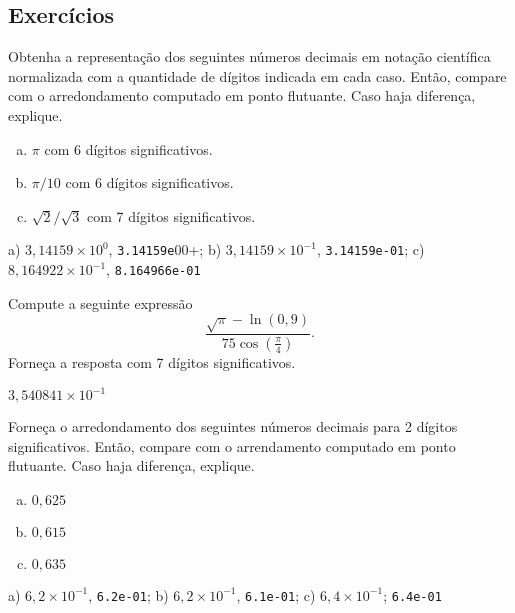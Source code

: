 \subsection{Exercícios}

\begin{exer}
  Obtenha a representação dos seguintes números decimais em notação científica normalizada com a quantidade de dígitos indicada em cada caso. Então, compare com o arredondamento computado em ponto flutuante. Caso haja diferença, explique.
  \begin{enumerate}[a)]
  \item $\pi$ com 6 dígitos significativos.
  \item $\pi/10$ com 6 dígitos significativos.
  \item $\sqrt{2}/\sqrt{3}$ com 7 dígitos significativos.
  \end{enumerate}
\end{exer}
\begin{resp}
  a) $3,14159\times 10^0$, \lstinline+3.14159e+00+; b) $3,14159\times 10^{-1}$, \lstinline+3.14159e-01+; c) $8,164922\times 10^{-1}$, \lstinline+8.164966e-01+
\end{resp}

\begin{exer}
  Compute a seguinte expressão
  \begin{equation}
    \frac{\sqrt{\pi} - \ln(0,9)}{75\cos\left(\frac{\pi}{4}\right)}.
  \end{equation}
  Forneça a resposta com 7 dígitos significativos.
\end{exer}
\begin{resp}
  $3,540841\times 10^{-1}$
\end{resp}

\begin{exer}
  Forneça o arredondamento dos seguintes números decimais para 2 dígitos significativos. Então, compare com o arrendamento computado em ponto flutuante. Caso haja diferença, explique.
  \begin{enumerate}[a)]
  \item $0,625$
  \item $0,615$
  \item $0,635$
  \end{enumerate}
\end{exer}
\begin{resp}
  a) $6,2\times 10^{-1}$, \lstinline+6.2e-01+; b) $6,2\times 10^{-1}$, \lstinline+6.1e-01+; c) $6,4\times 10^{-1}$; \lstinline+6.4e-01+
\end{resp}

